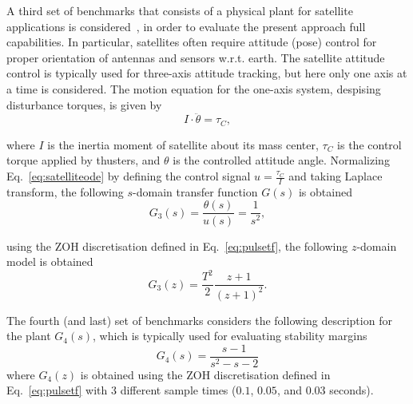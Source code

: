 \documentclass{sig-alternate-05-2015}
\begin{document}
A third set of benchmarks that consists of a physical plant for satellite
applications is considered~\cite{Franklin15}, in order to evaluate the
present approach full capabilities.  In particular, satellites often require
attitude (pose) control for proper orientation of antennas and sensors
w.r.t.  earth.  The satellite attitude control is typically used for
three-axis attitude tracking, but here only one axis at a time is
considered.  The motion equation for the one-axis system, despising
disturbance torques, is given by
%
\begin{equation}
\label{eq:satelliteode}
I\cdot \ddot{\theta} = \tau_{C},
\end{equation}

\noindent where $I$ is the inertia moment of satellite about its mass center, $\tau_{C}$ is the control 
torque applied by thusters, and $\theta$ is the controlled attitude angle. 
Normalizing Eq.~\eqref{eq:satelliteode} by defining the control signal $u=\frac{\tau_{C}}{I}$ and 
taking Laplace transform, the following $s$-domain transfer function $G(s)$ is obtained
%
\begin{equation}
\label{eq:satellitetf}
G_{3}(s)=\frac{\theta(s)}{u(s)}=\frac{1}{s^2},
\end{equation}

\noindent using the ZOH discretisation defined in Eq.~\eqref{eq:pulsetf}, 
the following $z$-domain model is obtained
%
\begin{equation}
G_{3}(z)= \frac{T^{2}}{2} \frac{z+1}{(z+1)^{2}}.
\end{equation}

%
%

The fourth (and last) set of benchmarks considers the following description for the plant 
$G_{4}(s)$, which is typically used for evaluating stability margins~\cite{bhattacharyya97,keel_Bhattacharyya_examples}
%
\begin{equation}
\label{exampleA}
G_{4}(s)=\frac{s-1}{s^{2}-s-2}
\end{equation}
%
\noindent where $G_{4}(z)$ is obtained using the ZOH discretisation defined 
in Eq.~\eqref{eq:pulsetf} with $3$ different sample times ($0.1$, $0.05$, and $0.03$ 
seconds).
\end{document}
